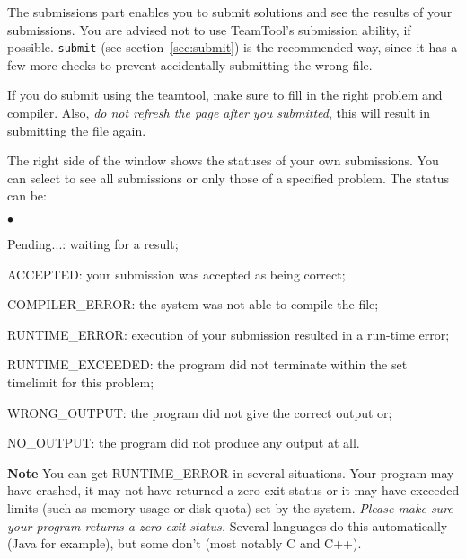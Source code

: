 \documentclass[a4paper]{artikel3}
\newcommand{\cmd}[1]{\texttt{#1}}
\newcommand{\strong}[1]{\textbf{#1}}
\newenvironment{citemize}
  {\begin{list}{$\bullet$}{\topsep 0cm \itemsep 0cm}}
  {\end{list}}
\begin{document}
The submissions part enables you to submit solutions and see the results of
your submissions. You are advised not to use TeamTool's submission ability,
if possible. \cmd{submit} (see section~\ref{sec:submit}) is the recommended
way, since it has a few more checks to prevent accidentally submitting the
wrong file.

If you do submit using the teamtool, make sure to fill in the right problem
and compiler. Also, \emph{do not refresh the page after you submitted}, this
will result in submitting the file again.

The right side of the window shows the statuses of your own submissions. You
can select to see all submissions or only those of a specified problem. The
status can be:

\begin{citemize}
\item[Pending...:] waiting for a result;
\item[ACCEPTED:] your submission was accepted as being correct;
\item[COMPILER\_ERROR:] the system was not able to compile the file;
\item[RUNTIME\_ERROR:] execution of your submission resulted in a run-time
error;
\item[RUNTIME\_EXCEEDED:] the program did not terminate within the set
timelimit for this problem;
\item[WRONG\_OUTPUT:] the program did not give the correct output or;
\item[NO\_OUTPUT:] the program did not produce any output at all.
\end{citemize}

\strong{Note} You can get RUNTIME\_ERROR in several situations. Your program
may have crashed, it may not have returned a zero exit status or it may have
exceeded limits (such as memory usage or disk quota) set by the system.
\emph{Please make sure your program returns a zero exit status.} Several
languages do this automatically (Java for example), but some
don't (most notably C and C++).
\end{document}
